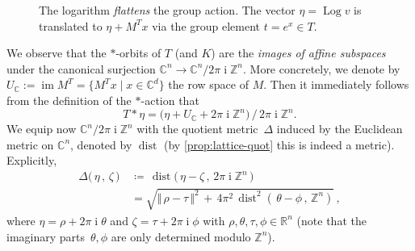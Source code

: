 \documentclass[a4paper,USenglish,cleveref,numberwithinsect]{lipics-v2021}
\DeclareMathOperator{\ii}{i}
\DeclareMathOperator{\Log}{Log}
\DeclareMathOperator{\dist}{dist}
\DeclareMathOperator{\ran}{im}
\newcommand{\CC}{\mathbb{C}}
\newcommand{\ZZ}{\mathbb{Z}}
\newcommand{\RR}{\mathbb{R}}
\numberwithin{equation}{section}
\begin{document}
\begin{figure}[ht]
\caption{\small The logarithm \textit{flattens} the group action.
 The vector $\eta=\Log v$ is translated to $\eta+M^T x$ via the group element $t= e^{x}\in T$.}%
 \label{fig:flatten-action}
\end{figure}

We observe that the $\ast$-orbits of $T$ (and $K$) are the
\textit{images of affine subspaces}
under the canonical surjection $\CC^n\rightarrow\CC^n/2\pi\ii\ZZ^n$.
More concretely, we denote by
$U_\CC:=\ran M^T = \{M^T x \mid x\in \CC^d\}$
the row space of $M$.
Then it immediately follows from the definition of the $\ast$-action that
\begin{equation}\label{eq:row-space}
	T\ast\eta = \Big(\eta + U_\CC +2\pi\ii\ZZ^n\Big)\,\big/\,2\pi\ii\ZZ^n .
\end{equation}
We equip now $\CC^n/2\pi\ii\ZZ^n$ with the quotient metric~$\Delta$
induced by the Euclidean metric on $\CC^n$, denoted by $\dist$
(by \cref{prop:lattice-quot} this is indeed a metric).
Explicitly,
\begin{equation}
\label{eq:delta}
	\begin{split}
	\Delta\big(\, \eta\, ,\, \zeta\, \big)\, &\coloneqq\, \dist\big(\, \eta-\zeta \, ,\, 2\pi\ii\ZZ^n \, \big)\\
	&=\sqrt{\Vert\, \rho-\tau\,\Vert^2 \, +\,4\pi^2\, \dist^2\left(\,\theta-\phi\,,\, \ZZ^n\right)}\, ,
\end{split}
\end{equation}
where $\eta=\rho+2\pi\ii\theta$ and $\zeta=\tau+2\pi\ii\phi$
with $\rho,\theta,\tau,\phi\in\RR^n$
(note that the imaginary parts~$\theta,\phi$ are only determined modulo $\ZZ^n$).
\end{document}

